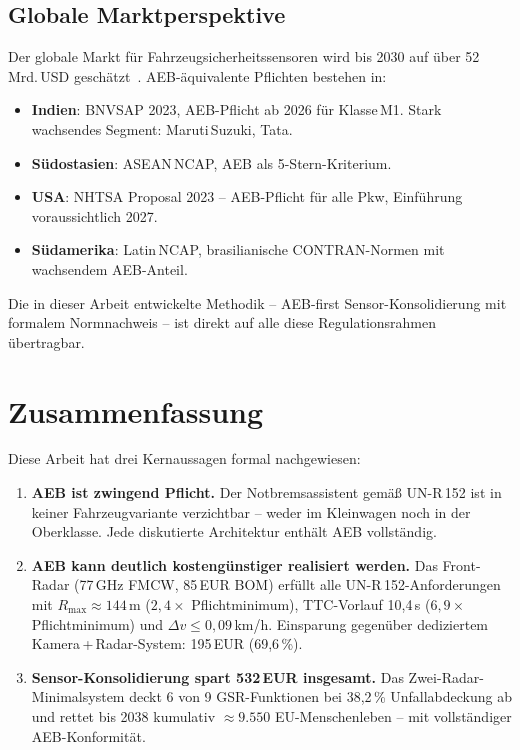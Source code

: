 \documentclass[a4paper,12pt]{article}
\theoremstyle{definition}
\begin{document}
\subsection{Globale Marktperspektive}

Der globale Markt f\"ur Fahrzeugsicherheitssensoren wird bis 2030 auf
\"uber 52\,Mrd.\,USD gesch\"atzt~\cite{marketsandmarkets2024radar}.
AEB-\"aquivalente Pflichten bestehen in:

\begin{itemize}
  \item \textbf{Indien}: BNVSAP 2023, AEB-Pflicht ab 2026 f\"ur
        Klasse\,M1. Stark wachsendes Segment: Maruti\,Suzuki, Tata.
  \item \textbf{S\"udostasien}: ASEAN\,NCAP, AEB als 5-Stern-Kriterium.
  \item \textbf{USA}: NHTSA Proposal 2023 -- AEB-Pflicht f\"ur alle
        Pkw, Einf\"uhrung voraussichtlich 2027.
  \item \textbf{S\"udamerika}: Latin\,NCAP, brasilianische CONTRAN-Normen
        mit wachsendem AEB-Anteil.
\end{itemize}

Die in dieser Arbeit entwickelte Methodik -- AEB-first Sensor-Konsolidierung
mit formalem Normnachweis -- ist direkt auf alle diese Regulationsrahmen
\"ubertragbar.

\section{Zusammenfassung}

Diese Arbeit hat drei Kernaussagen formal nachgewiesen:

\begin{enumerate}
  \item \textcolor{accentred}{\textbf{AEB ist zwingend Pflicht.}} Der
        Notbremsassistent gem\"a\ss{} UN-R\,152 ist in keiner Fahrzeugvariante
        verzichtbar -- weder im Kleinwagen noch in der Oberklasse. Jede
        diskutierte Architektur enth\"alt AEB vollst\"andig.
  \item \textbf{AEB kann deutlich kosteng\"unstiger realisiert werden.}
        Das Front-Radar (77\,GHz FMCW, 85\,EUR BOM) erf\"ullt alle
        UN-R\,152-Anforderungen mit $R_{\max}\approx144$\,m
        ($2{,}4\times$ Pflichtminimum), TTC-Vorlauf 10,4\,s
        ($6{,}9\times$ Pflichtminimum) und $\Delta v\le0{,}09$\,km/h.
        Einsparung gegen\"uber dediziertem Kamera\,+\,Radar-System:
        195\,EUR (69,6\,\%).
  \item \textbf{Sensor-Konsolidierung spart 532\,EUR insgesamt.}
        Das Zwei-Radar-Minimal\-system deckt 6 von 9 GSR-Funktionen bei
        38,2\,\% Unfallabdeckung ab und rettet bis 2038 kumulativ
        $\approx9.550$ EU-Menschenleben -- mit vollst\"andiger
        AEB-Konformit\"at.
\end{enumerate}
\end{document}
